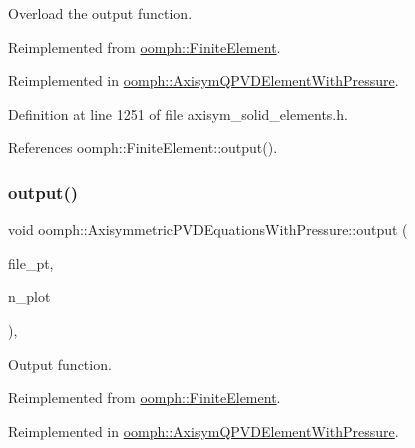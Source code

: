 Overload the output function. 



Reimplemented from \hyperlink{classoomph_1_1FiniteElement_a72cddd09f8ddbee1a20a1ff404c6943e}{oomph\+::\+Finite\+Element}.



Reimplemented in \hyperlink{classoomph_1_1AxisymQPVDElementWithPressure_a8f09df5914ea8dbb6ba7041bd6be15bd}{oomph\+::\+Axisym\+Q\+P\+V\+D\+Element\+With\+Pressure}.



Definition at line 1251 of file axisym\+\_\+solid\+\_\+elements.\+h.



References oomph\+::\+Finite\+Element\+::output().

\mbox{\label{classoomph_1_1AxisymmetricPVDEquationsWithPressure_a3a6d03fa236a2e0173abbc1734799d19}} 
\subsubsection{\texorpdfstring{output()}{output()}\hspace{0.1cm}{\footnotesize\ttfamily [4/4]}}
{\footnotesize\ttfamily void oomph\+::\+Axisymmetric\+P\+V\+D\+Equations\+With\+Pressure\+::output (\begin{DoxyParamCaption}\item[{F\+I\+LE $\ast$}]{file\+\_\+pt,  }\item[{const unsigned \&}]{n\+\_\+plot }\end{DoxyParamCaption})\hspace{0.3cm}{\ttfamily [inline]}, {\ttfamily [virtual]}}



Output function. 



Reimplemented from \hyperlink{classoomph_1_1FiniteElement_adfaee690bb0608f03320eeb9d110d48c}{oomph\+::\+Finite\+Element}.



Reimplemented in \hyperlink{classoomph_1_1AxisymQPVDElementWithPressure_a273e1cfc1185192fcb9cc3812360c87e}{oomph\+::\+Axisym\+Q\+P\+V\+D\+Element\+With\+Pressure}.



